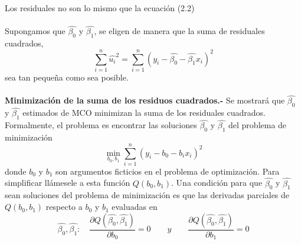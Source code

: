 Los residuales no son lo mismo que la ecuación (2.2)\\\\
Supongamos que $\hat{\beta_0}$ y $\hat{\beta_1}$, se eligen de manera que la suma de residuales cuadrados, 
\begin{equation}
    \sum\limits_{i=1}^n \hat{u_i}^2 = \sum\limits_{i=1}^n (y_i - \hat{\beta_0} - \hat{\beta_1}x_i)^2
\end{equation}
sea tan pequeña como sea posible. \\\\

\textbf{Minimización de la suma de los residuos cuadrados.-}
Se mostrará que $\hat{\beta_0}$ y $\hat{\beta_1}$ estimados de MCO minimizan la suma de los residuales cuadrados. Formalmente, el problema es encontrar las soluciones $\hat{\beta_0}$ y $\hat{\beta_1}$ del problema de minimización 
$$\min_{b_0,b_1} \sum_{i=1}^n (y_i-b_0-b_ix_i)^2$$
donde $b_0$ y $b_1$ son argumentos ficticios en el problema de optimización. Para simplificar llámesele a esta función $Q(b_0,b_1)$. Una condición para que $\hat{\beta_0}$ y $\hat{\beta_1}$ sean soluciones del problema de minimización es que las derivadas parciales de $Q(b_0,b_1)$ respecto a $b_0$ y $b_1$ evaluadas en $$\hat{\beta_0},\hat{\beta_1}: \quad \dfrac{\partial Q(\hat{\beta_0},\hat{\beta_1})}{\partial b_0}=0 \qquad y \qquad \dfrac{\partial Q(\hat{\beta_0},\hat{\beta_1})}{\partial b_1}=0$$



